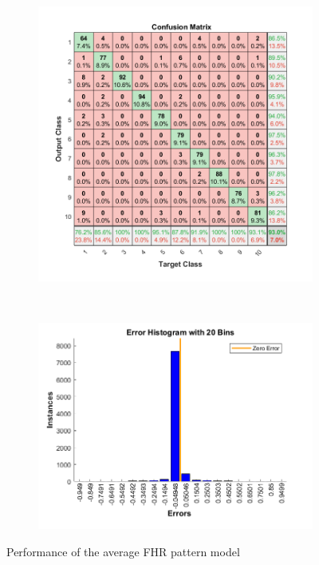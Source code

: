 \documentclass[11pt,a4paper]{article}
\begin{document}
\begin{figure}[htb]
  \centering
  \begin{subfigure}[b]{0.45\textwidth}
    \centering
    \includegraphics[width=\textwidth]{figures/CLASS/avg_conf_matrix.png}
  \end{subfigure}
  ~
  \begin{subfigure}[b]{0.45\textwidth}
    \centering
    \includegraphics[width=\textwidth]{figures/CLASS/avg_err_hist.png}
  \end{subfigure}
  \caption{Performance of the average FHR pattern model}
  \label{fig:CLASS_AVG}
\end{figure}
\end{document}
